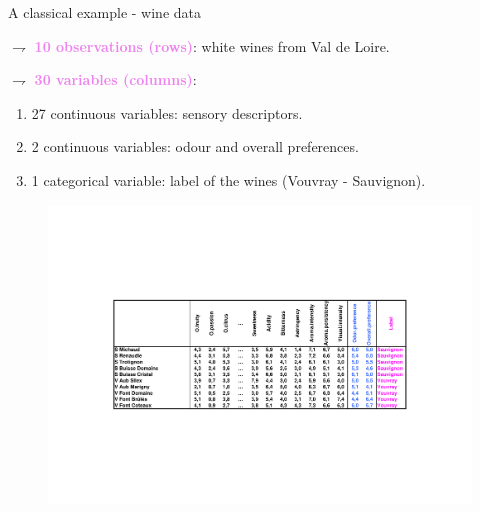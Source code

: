 \documentclass[9pt]{beamer}
\begin{document}
\begin{frame}{A classical example - wine data}

$\rightharpoondown$ \textcolor{violet}{{\bf 10 observations (rows)}}: white wines from Val de Loire.

$\rightharpoondown$ \textcolor{violet}{{\bf 30 variables (columns)}}:
\begin{enumerate}[-]
\item \textcolor{lighto}{27 continuous variables}: sensory descriptors.
\item \textcolor{lighto}{2 continuous variables}: odour and overall preferences.
\item \textcolor{lighto}{1 categorical variable}: label of the wines (Vouvray - Sauvignon).
\end{enumerate}

\begin{figure}[H]
\begin{center}
\includegraphics[width=\textwidth]{./wine_tab_don.pdf} 
\end{center}
\end{figure}
\vfill
\end{frame}
\end{document}
